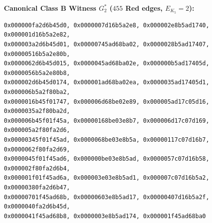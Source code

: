 \documentclass[11pt,a4paper]{article}
\theoremstyle{plain}
\theoremstyle{definition}
\begin{document}
\noindent\textbf{Canonical Class B Witness $G^*_2$ ($455$ Red edges, $E_{K_5} = 2$):}
{\footnotesize
\begin{verbatim}
0x000000fa2d6b45d0, 0x0000007d16b5a2e8, 0x000002e8b5ad1740, 0x000001d16b5a2e82,
0x000003a2d6b45d01, 0x00000745ad68ba02, 0x0000028b5ad17407, 0x00000516b5a2e80b,
0x0000062d6b45d015, 0x0000045ad68ba02e, 0x000000b5ad17405d, 0x0000056b5a2e80b8,
0x000002d6b45d0174, 0x000001ad68ba02ea, 0x0000035ad17405d1, 0x000006b5a2f80ba2,
0x0000016b45f01747, 0x000006d68be02e89, 0x000005ad17c05d16, 0x0000035a2f80ba2d,
0x000006b45f01f45a, 0x00000168be03e8b7, 0x000006d17c07d169, 0x000005a2f80fa2d6,
0x00000345f01f45ad, 0x0000068be03e8b5a, 0x00000117c07d16b7, 0x0000062f80fa2d69,
0x0000045f01f45ad6, 0x000000be03e8b5ad, 0x0000057c07d16b58, 0x000002f80fa2d6b4,
0x000001f01f45ad6a, 0x000003e03e8b5ad1, 0x000007c07d16b5a2, 0x00000380fa2d6b47,
0x00000701f45ad68b, 0x00000603e8b5ad17, 0x00000407d16b5a2f, 0x0000040fa2d6b45d,
0x0000041f45ad68b8, 0x0000003e8b5ad174, 0x000001f45ad68ba0
\end{verbatim}
}



\end{document}
